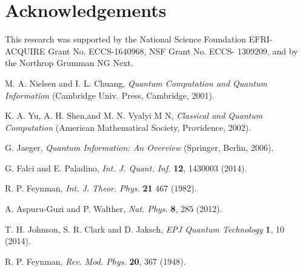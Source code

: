 \documentclass[twocolumn,amsmath, amssymb, superscriptaddress, pra]{revtex4}
\begin{document}
\section*{Acknowledgements}This research was supported by the National Science Foundation EFRI-ACQUIRE Grant No. ECCS-1640968, NSF Grant No. ECCS- 1309209, and by the Northrop
Grumman NG Next.



\begin{thebibliography}{99}


 M. A. Nielsen and I. L. Chuang,  \emph{Quantum Computation
    and Quantum Information} (Cambridge Univ. Press, Cambridge, 2001).

 K. A. Yu,  A. H. Shen,and M. N. Vyalyi M N, \emph{Classical
    and Quantum Computation}  (American Mathematical Society, Providence,
    2002).

 G. Jaeger, \emph{Quantum Information: An Overview}
    (Springer, Berlin, 2006).

 G. Falci and E. Paladino, \emph{Int. J. Quant. Inf.}
    \textbf{12}, 1430003 (2014).
%
%
%
%
%

 R. P. Feynman,  \emph{Int. J.  Theor. Phys. } \textbf{21} 467
    (1982).

 A. Aspuru-Guzi and P. Walther,  \emph{Nat. Phys.}
    \textbf{8}, 285 (2012).

 T. H. Johnson, S. R. Clark   and D. Jaksch, \emph{EPJ
    Quantum Technology} \textbf{1}, 10 (2014).

 R. P. Feynman, \emph{Rev. Mod. Phys.} \textbf{20},
    367 (1948).


\end{thebibliography}
\end{document}
